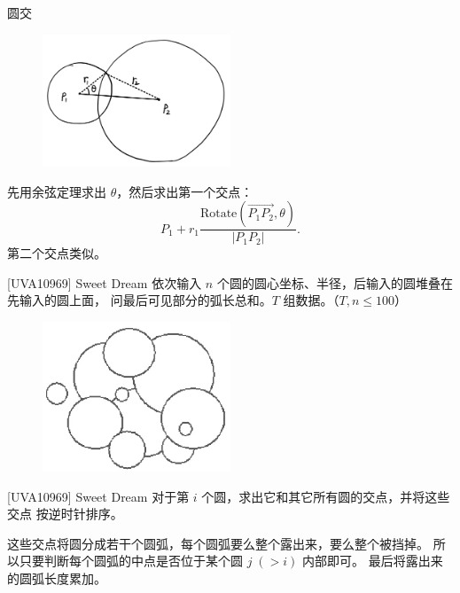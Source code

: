 \documentclass{beamer}
\begin{document}
\begin{frame}{圆交}
    \small
    \begin{figure}[H]
        \centering
        \includegraphics[width=0.5\textwidth]{pic/twocircle.jpg}
    \end{figure}
    先用余弦定理求出 $\theta$，\pause 然后求出第一个交点：
    \begin{equation}
        P_1+r_1\frac{\text{Rotate}(\overrightarrow{P_1P_2},\theta)}{|P_1P_2|}.
    \end{equation}
    第二个交点类似。
\end{frame}

\begin{frame}{[UVA10969] Sweet Dream}
    \small
    依次输入 $n$ 个圆的圆心坐标、半径，后输入的圆堆叠在先输入的圆上面，
    问最后可见部分的弧长总和。$T$ 组数据。（$T,n\leq 100$）

    \begin{figure}[H]
        \centering
        \includegraphics[width=0.5\textwidth]{pic/sweetdream.png}
    \end{figure}
\end{frame}

\begin{frame}{[UVA10969] Sweet Dream}
    \small
    对于第 $i$ 个圆，求出它和其它所有圆的交点，并将这些交点
    按逆时针排序。

    \vspace{1em}\pause
    这些交点将圆分成若干个圆弧，每个圆弧要么整个露出来，要么整个被挡掉。
    所以只要判断每个圆弧的中点是否位于某个圆 $j\;(>i)$ 内部即可。
    最后将露出来的圆弧长度累加。
\end{frame}
\end{document}
